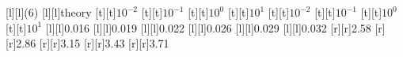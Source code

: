 [l][l]{\fontsize{9}{13.5}\selectfont \color[rgb]{0,0,0}(6)}%
[l][l]{\fontsize{9}{13.5}\selectfont \color[rgb]{0,0,0}theory}%
%
\fontsize{9}{13.5}%
\selectfont%
%
[t][t]{$10^{-2}$}%
[t][t]{$10^{-1}$}%
[t][t]{$10^{0}$}%
[t][t]{$10^{1}$}%
[t][t]{$10^{-2}$}%
[t][t]{$10^{-1}$}%
[t][t]{$10^{0}$}%
[t][t]{$10^{1}$}%
%
[l][l]{0.016}%
[l][l]{0.019}%
[l][l]{0.022}%
[l][l]{0.026}%
[l][l]{0.029}%
[l][l]{0.032}%
[r][r]{2.58}%
[r][r]{2.86}%
[r][r]{3.15}%
[r][r]{3.43}%
[r][r]{3.71}%
%
%
